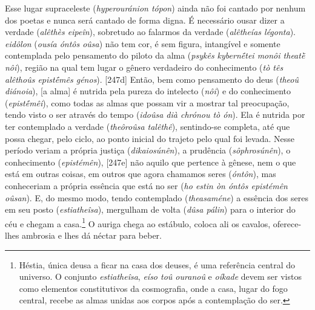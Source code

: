 Esse lugar supraceleste (\emph{hyperouránion tópon}) ainda não foi
cantado por nenhum dos poetas e nunca será cantado de forma digna. É
necessário ousar dizer a verdade (\emph{alêthès eipeîn}), sobretudo ao
falarmos da verdade (\emph{alêtheías légonta}). \emph{eidôlon}
(\emph{ousía óntôs oûsa}) não tem cor, é sem figura, intangível e
somente contemplada pelo pensamento do piloto da alma (\emph{psykês
kybernḗtei monôi theatḕ nôi}), região na qual tem lugar o gênero
verdadeiro do conhecimento (\emph{tò tês alêthoûs epistḗmês génos}).
{[}247d{]} Então, bem como pensamento do deus (\emph{theoû diánoia}),
{[}a alma{]} é nutrida pela pureza do intelecto (\emph{nôi}) e do
conhecimento (\emph{epistḗmêi}), como todas as almas que possam vir a
mostrar tal preocupação, tendo visto o ser através do tempo
(\emph{idoûsa dià chrónou tò ón}). Ela é nutrida por ter contemplado a
verdade (\emph{theôroûsa talêthê}), sentindo-se completa, até que possa
chegar, pelo ciclo, ao ponto inicial do trajeto pelo qual foi levada.
Nesse período veriam a própria justiça (\emph{dikaiosúnên}), a prudência
(\emph{sôphrosúnên}), o conhecimento (\emph{epistémên}), {[}247e{]} não
aquilo que pertence à gênese, nem o que está em outras coisas, em outros
que agora chamamos seres (\emph{óntôn}), mas conheceriam a própria
essência que está no ser (\emph{ho estin òn óntôs epistémên oûsan}). E,
do mesmo modo, tendo contemplado (\emph{theasaméne}) a essência dos
seres em seu posto (\emph{estiatheîsa}), mergulham de volta (\emph{dûsa
pálin}) para o interior do céu e chegam a casa.\footnote{Héstia, única
  deusa a ficar na casa dos deuses, é uma referência central do
  universo. O conjunto \emph{estiatheîsa}, \emph{eíso toû ouranoû} e
  \emph{oíkade} devem ser vistos como elementos constitutivos da
  cosmografia, onde a casa, lugar do fogo central, recebe as almas
  unidas aos corpos após a contemplação do ser.} O auriga chega ao
estábulo, coloca ali os cavalos, oferece-lhes ambrosia e lhes dá néctar
para beber.

